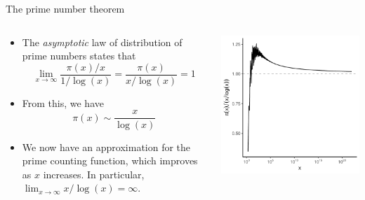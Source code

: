 \documentclass[,aspectratio=169]{beamer}
\begin{document}
\begin{frame}{The prime number theorem}
\protect\hypertarget{the-prime-number-theorem}{}
\begin{columns}[T]
\begin{column}{0.49\textwidth}
\begin{itemize}
\item
  The \emph{asymptotic} law of distribution of prime numbers states that
  \[
  \lim_{x\to\infty} \frac{\pi(x)/x}{1 / \log(x)} = \frac{\pi(x)}{x/\log(x)} = 1
  \] \pause
\item
  From this, we have \[
  \pi(x) \sim \frac{x}{\log(x)}
  \]
\item
  We now have an approximation for the prime counting function, which
  improves as \(x\) increases. In particular,
  \(\lim_{x\to\infty} x / \log (x) = \infty\).
\end{itemize}
\end{column}

\begin{column}{0.49\textwidth}
\includegraphics{figure/unnamed-chunk-5-1.pdf}
\end{column}
\end{columns}
\end{frame}
\end{document}
